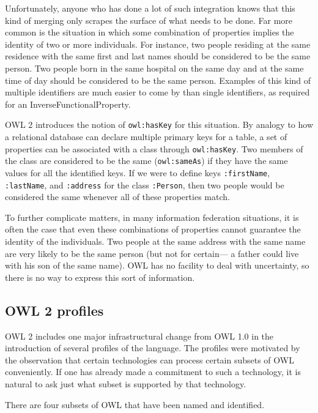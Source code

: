 Unfortunately, anyone who has done a lot of such integration knows that
this kind of merging only scrapes the surface of what needs to be done.
Far more common is the situation in which some combination of properties
implies the identity of two or more individuals. For instance, two
people residing at the same residence with the same first and last names
should be considered to be the same person. Two people born in the same
hospital on the same day and at the same time of day should be
considered to be the same person. Examples of this kind of multiple
identifiers are much easier to come by than single identifiers, as
required for an InverseFunctionalProperty.

OWL 2 introduces the notion of \texttt{owl:hasKey} for this situation. By analogy
to how a relational
database can declare multiple primary keys for a table, a set of
properties can be associated with a class through \texttt{owl:hasKey}. Two
members of the class are considered to be the same (\texttt{owl:sameAs}) if they
have the same values for all the identified keys. If we were to define
keys \texttt{:firstName},
\texttt{:lastName}, and \texttt{:address} for the class \texttt{:Person}, then two people would be
considered the same
whenever all of these properties match.

To further complicate matters, in many information federation
situations, it is often the case that even these combinations of
properties cannot guarantee the identity of the individuals. Two people
at the same address with the same name are very likely to be the same
person (but not for certain--- a father could live with his son of the
same name). OWL has no facility to deal with uncertainty, so there is no
way to express this sort of information.

\subsection{OWL 2 profiles}

OWL 2 includes one major infrastructural change from OWL 1.0 in the
introduction of several profiles of the language. The profiles were
motivated by the observation that certain technologies can process
certain subsets of OWL conveniently. If one has already made a
commitment to such a technology, it is natural to ask just what subset
is supported by that technology.

There are four subsets of OWL that have been named and identified.

